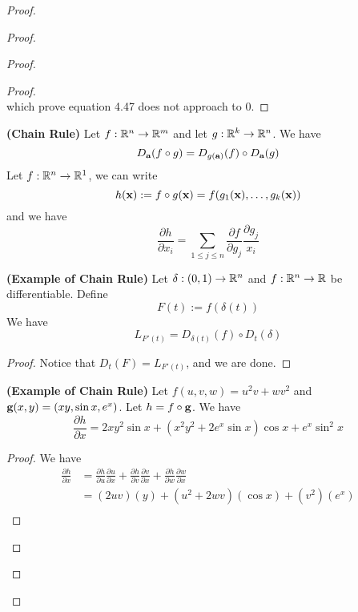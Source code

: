 \documentclass{report}
\begin{document}
\begin{proof}
\begin{proof}
\begin{proof}
\begin{proof}
\begin{equation}
\end{equation}
which prove  equation 4.47 does not approach to 0.
\end{proof}
\begin{theorem}
\label{6.3.4}
\textbf{(Chain Rule)} Let $f:\mathbb{R}^n\rightarrow \mathbb{R}^m$ and let $g:\mathbb{R}^k\rightarrow \mathbb{R}^n$. We have
\begin{equation}
D_{\textbf{a}}(f\circ g)=D_{g(\textbf{a})}(f)\circ D_{\textbf{a}}(g)
\end{equation}
Let $f:\mathbb{R}^n\rightarrow \mathbb{R}^1$, we can write 
\begin{equation}
h(\textbf{x}):=f\circ g(\textbf{x})=f(g_1(\textbf{x}),\dots, g_k(\textbf{x}))
\end{equation}
and we have
\begin{equation}
\frac{\partial h}{\partial x_i}=\sum_{1\leq j\leq n}\frac{\partial f}{\partial g_j}\frac{\partial g_j}{x_i}
\end{equation}
\end{theorem}
\begin{theorem}
\label{6.3.5}
\textbf{(Example of Chain Rule)} Let $\delta:(0,1)\rightarrow \mathbb{R}^n$ and $f:\mathbb{R}^n\rightarrow \mathbb{R}$ be differentiable. Define
\begin{equation}
F(t):=f(\delta (t))
\end{equation}
We have
\begin{equation}
L_{F'(t)}=D_{\delta (t)}(f)\circ D_{t}(\delta)
\end{equation}
\end{theorem}
\begin{proof}
Notice that $D_t(F)=L_{F'(t)}$, and we are done.
\end{proof}
\begin{theorem}
\label{6.3.6}
\textbf{(Example of Chain Rule)} Let $f(u,v,w)=u^2v+wv^2$ and $\textbf{g}(x,y)=(xy,\sin x,e^x)$. Let $h=f\circ \textbf{g}$. We have
\begin{equation}
\frac{\partial h}{\partial x}=2xy^2\sin x+(x^2y^2+2e^x\sin x) \cos x+ e^x\sin^2 x
\end{equation}
\end{theorem}
\begin{proof}
We have
\begin{align}
  \frac{\partial h}{\partial x}&=\frac{\partial h}{\partial u}\frac{\partial u}{\partial x}+\frac{\partial h}{\partial v}\frac{\partial v}{\partial x}+\frac{\partial h}{\partial w}\frac{\partial w}{\partial x}\\
  &=(2uv)(y)+(u^2+2wv)(\cos x)+(v^2)(e^x)\\

\end{align}
\end{proof}
\end{proof}
\end{proof}
\end{proof}
\end{document}
